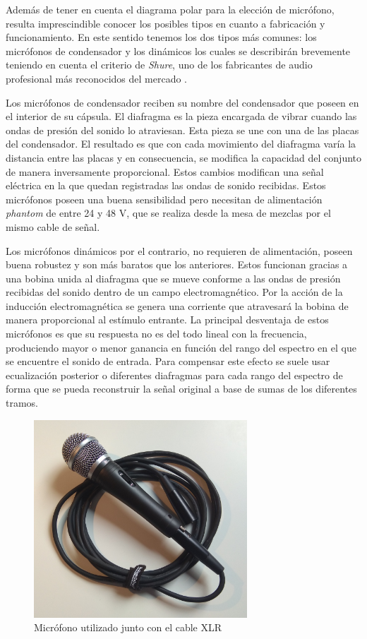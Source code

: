 Además de tener en cuenta el diagrama polar para la elección de micrófono, resulta imprescindible conocer los posibles tipos en cuanto a fabricación y funcionamiento. En este sentido tenemos los dos tipos más comunes: los micrófonos de condensador y los dinámicos los cuales se describirán brevemente teniendo en cuenta el criterio de \emph{Shure}, uno de los fabricantes de audio profesional más reconocidos del mercado \cite{shuremic}.

Los micrófonos de condensador reciben su nombre del condensador que poseen en el interior de su cápsula. El diafragma es la pieza encargada de vibrar cuando las ondas de presión del sonido lo atraviesan. Esta pieza se une con una de las placas del condensador. El resultado es que con cada movimiento del diafragma varía la distancia entre las placas y en consecuencia, se modifica la capacidad del conjunto de manera inversamente proporcional. Estos cambios modifican una señal eléctrica en la que quedan registradas las ondas de sonido recibidas. Estos micrófonos poseen una buena sensibilidad pero necesitan de alimentación \emph{phantom} de entre 24 y 48 V, que se realiza desde la mesa de mezclas por el mismo cable de señal.

Los micrófonos dinámicos por el contrario, no requieren de alimentación, poseen buena robustez y son más baratos que los anteriores. Estos funcionan gracias a una bobina unida al diafragma que se mueve conforme a las ondas de presión recibidas del sonido dentro de un campo electromagnético. Por la acción de la inducción electromagnética se genera una corriente que atravesará la bobina de manera proporcional al estímulo entrante. La principal desventaja de estos micrófonos es que su respuesta no es del todo lineal con la frecuencia, produciendo mayor o menor ganancia en función del rango del espectro en el que se encuentre el sonido de entrada. Para compensar este efecto se suele usar ecualización posterior o diferentes diafragmas para cada rango del espectro de forma que se pueda reconstruir la señal original a base de sumas de los diferentes tramos.

\begin{figure}[!hb]
\begin{center}
\includegraphics[width=8cm]{img/microusado.jpg}
\caption{\label{fig:microusado}Micrófono utilizado junto con el cable XLR}
\end{center}
\end{figure}

